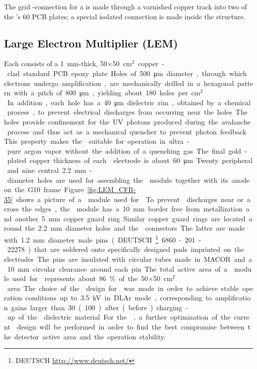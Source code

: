 The grid -connection for a  is made through a varnished copper track into two of the 's \num{60} PCB plates; a special isolated connection %
is made inside the  structure.


\subsection{Large Electron Multiplier (LEM)}
\label{sec:fddp-crp-lem}

Each  consists of a \SI{1}{mm}-thick,  \num{50}$\times$\SI{50}{cm$^{2}$} copper-clad standard PCB epoxy plate. Holes of \SI{500}{\micro\meter} diameter, through which electrons undergo amplification, are mechanically drilled in a hexagonal pattern with a pitch of \SI{800}{\micro\meter}, yielding about \num{180} holes per \si{cm$^2$}. In addition, each hole has a  \SI{40}{\micro\meter} dielectric rim, obtained by a chemical process, to prevent electrical discharges from occurring near the holes. The holes provide confinement for the UV photons produced during the avalanche process and thus act as a mechanical quencher to prevent photon feedback. This property makes the  suitable for operation in ultra-pure argon vapor without the addition of a quenching gas. The final gold-plated copper thickness of each  electrode is about  \SI{60}{\micro\meter}. Twenty peripheral and nine central \SI{2.2}{mm}-diameter holes are used for assembling the  module together with its anode on the G10 frame. Figure~\ref{fig:LEM_CFR-35} shows a picture of a  module used for  . To prevent  discharges near or across the edges, the  module has a  \SI{10}{mm} border free from metallization and another \SI{5}{mm} copper guard ring. Similar copper guard rings are located around the \SI{2.2}{mm} diameter holes and the  connectors. The latter are made with \SI{1.2}{mm} diameter male pins (DEUTSCH~\footnote{DEUTSCH\texttrademark{} \url{http://www.deutsch.net/}} 6860-201-22278) that are soldered onto specifically designed pads imprinted on the  electrodes. The pins are insulated with circular tubes made in MACOR and a  \SI{10}{mm} circular clearance around each pin. 

The total active area of a  module used for   represents about \SI{86}{\%} of the \num{50}$\times$\SI{50}{cm$^{2}$} area. The choice of the  design for   was made in order to achieve stable operation conditions up to \SI{3.5}{kV} in DLAr mode, corresponding to amplification gains larger than \num{30} (\num{100}) after (before) charging-up of the  dielectric material. For the , a further optimization of the current  design will  be performed in order  to find the best compromise between the detector active area and the operation stability.

